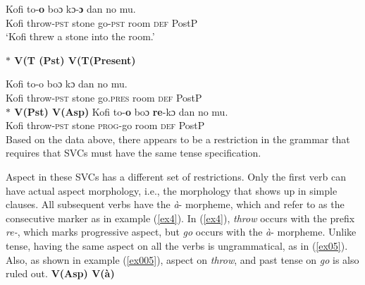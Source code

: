 \documentclass[output=paper,colorlinks,citecolor=brown]{langscibook}
\begin{document}
\ea\label{ex01} 
\gll Kofi to-\textbf{o} boɔ kɔ-\textbf{ɔ} dan no mu. \\
    Kofi throw-\textsc{pst} stone go-\textsc{pst} room \textsc{def} PostP   \\
\glt `Kofi threw a stone into the room.'

\z 
\ex\label{ex2}
\textbf{$\ast$ \phantom {} {} {}  V(T (Pst)\phantom {} {} {}   V(T(Present)} 
     \ea\label{ex001} 

\gll * Kofi to-o boɔ  kɔ dan no mu.\\
	{} Kofi throw-\textsc{pst} stone  go.\textsc{pres} room \textsc{def} PostP\\
\z 
\ex\label{ex3}
\textbf{$\ast$ \phantom {} {} {}  V(Pst)\phantom {} {} {}   V(Asp)} 
     \ea\label{ex0001} 
\gll * Kofi to-\textbf{o} boɔ  \textbf{re}-kɔ dan no mu.\\
	{} Kofi throw-\textsc{pst} stone  \textsc{prog}-go room  \textsc{def} PostP\\	
\z 
\z \z 
Based on the data above, there appears to be a restriction in the grammar that requires that SVCs must have the same tense specification.    

Aspect in these SVCs has a different set of restrictions. Only the first verb can have actual aspect morphology, i.e., the morphology that shows up in simple clauses. All subsequent verbs have the \emph{\`a}- morpheme, which \citet{Dolphyne1996} and \citet{Osam2003} refer to as the consecutive marker as in example (\ref{ex4}). In (\ref{ex4}), \emph{throw} occurs with the prefix \emph{re-}, which marks progressive aspect, but \emph{go} occurs with the \emph{\`a}- morpheme. Unlike tense, having the same aspect on all the verbs is ungrammatical, as in (\ref{ex05}). Also, as shown in example (\ref{ex005}), aspect on \emph{throw}, and past tense on \emph{go} is also ruled out. 
\ea \label{ex04}
\ea \textbf{V(Asp) \phantom {} {} {} V(\`a)}
\end{document}
